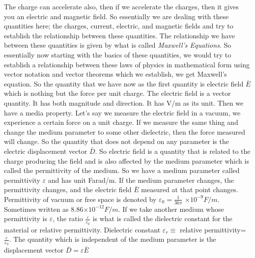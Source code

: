 \begin{mdframed}[ backgroundcolor=lightblue, linewidth=1pt, hidealllines=true]
The charge can accelerate also, then if we accelerate the charges, then it gives you an electric and magnetic field. So essentially we are dealing with these quantities here; the charges, current, electric, and magnetic fields and try to establish the relationship between these quantities. The relationship we have between these quantities is given by what is called \emph{Maxwell's Equations}. So essentially now starting with the basics of these quantities, we would try to establish a relationship between these laws of physics in mathematical form using vector notation and vector theorems which we establish, we get Maxwell's equation. So the quantity that we have now as the first quantity is electric field $\bar{E}$ which is nothing but the force per unit charge. The electric field is a vector quantity. It has both magnitude and direction. It has V/m as its unit. Then we have a media property. Let's say we measure the electric field in a vacuum, we experience a certain force on a unit charge. If we measure the same thing and change the medium parameter to some other dielectric, then the force measured will change. So the quantity that does not depend on any parameter is the electric displacement vector $\bar{D}$.
So electric field is a quantity that is related to the charge producing the field and is also affected by the medium parameter which is called the permittivity of the medium. So we have a medium parameter called permittivity $\varepsilon$ and has unit Farad/m. If the medium parameter changes, the permittivity changes, and the electric field $\bar{E}$ measured at that point changes. Permittivity of vacuum or free space is denoted by $\varepsilon_{0} =\frac{1}{36\pi}$ $\times 10^{-9}F/m$. Sometimes written as 8.86$\times10^{-12}F/m.$
If we take another medium whose permittivity is $\varepsilon$, the ratio $\frac{\varepsilon}{\varepsilon_{0}}$ is what is called the dielectric constant for the material or relative permittivity. 
Dielectric constant $\varepsilon_{r}\equiv$ relative permittivity= $\frac{\varepsilon}{\varepsilon_{0}}$.
The quantity which is independent of the medium parameter is the displacement vector $\bar{D}=\varepsilon \bar{E}$


\end{mdframed}
